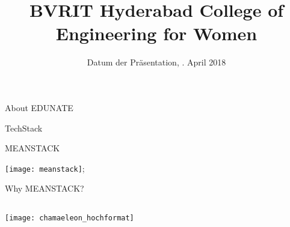 \documentclass{beamer}
\title{BVRIT Hyderabad College of Engineering for Women}
\date[09.04.2018]{Datum der Präsentation, \zB 9. April 2018}
\begin{document}
\begin{withoutheadline}


\begin{frame}
	\maketitle
	
\end{frame}
\end{withoutheadline}

\begin{frame}	\begin{center}
		\Huge
About EDUNATE
	\end{center}
\end{frame}

\begin{frame}{TechStack}
	\begin{center}
		\Huge
MEANSTACK
	\end{center}
	 {\texttt{[image: meanstack]}};



\end{frame}


\begin{frame}{Why MEANSTACK?}
	\begin{columns}
		\begin{column}{5cm}
			\begin{center}
				\texttt{[image: chamaeleon\_hochformat]}
				
				{\tiny \textcolor{digiPH_darkorange}{ }}
			\end{center}
		\end{column}
		\begin{column}{5cm}
			\begin{center}
				\Large
			
			\end{center}
			
		\end{column}
	\end{columns}
\end{frame}
\end{document}
